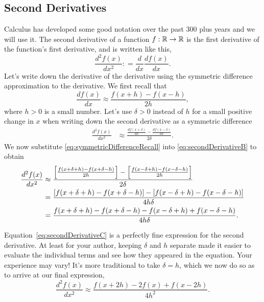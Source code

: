 \subsection{Second Derivatives}
\label{sec:SecondDerivative}

Calculus has developed some good notation over the past 300 plus years and we will use it. The second derivative of a function  $f:\mathbb R \to \mathbb R $ is the first derivative of the function's first derivative, and is written like this,
\begin{equation}
    \label{eq:secondDerivative}
    \frac{d^2 f(x)}{dx^2}: = \frac{d}{dx}\frac{df(x)}{dx}.
\end{equation}
Let's write down the derivative of the derivative using the symmetric difference approximation to the derivative. We first recall that
\begin{equation}
\label{eq:symmetricDifferenceRecall}
   \frac{df(x)}{dx}\approx \frac{f(x + h)- f(x-  h)}{2 h},
\end{equation}
where $h>0$ is a small number. 
Let's use $\delta>0$ instead of $h$ for a small positive change in $x$ when writing down the second derivative as a symmetric difference
\begin{equation}
    \label{eq:secondDerivativeB}
    \begin{aligned}
    \frac{d^2 f(x)}{dx^2}&\approx\frac{ \frac{df(x+\delta)}{dx} -  \frac{df(x-\delta)}{dx} }{2 \delta}.
    \end{aligned}
\end{equation}
We now substitute \eqref{eq:symmetricDifferenceRecall} into \eqref{eq:secondDerivativeB} to obtain
\begin{equation}
    \label{eq:secondDerivativeC}
    \begin{aligned}
    \frac{d^2 f(x)}{dx^2}&\approx\frac{ \left[ \frac{f(x + \delta + h)- f(x + \delta -  h)}{2 h}  \right]-   \left[ \frac{f(x - \delta + h)- f(x - \delta -  h)}{2 h}  \right]}{2 \delta} \medskip\\
    & = \frac{ \left[f(x + \delta + h)- f(x + \delta -  h) \right]-   \left[ f(x - \delta + h)- f(x - \delta -  h) \right]}{4 h \delta} \medskip \\
     & = \frac{ f(x + \delta + h)- f(x + \delta -  h) -   f(x - \delta + h) +  f(x - \delta -  h) }{4 h \delta}.
    \end{aligned}
\end{equation}

Equation~\eqref{eq:secondDerivativeC} is a perfectly fine expression for the second derivative. At least for your author, keeping $\delta$ and $h$ separate made it easier to evaluate the individual terms and see how they appeared in the equation. Your experience may vary! It's more traditional to take $\delta = h$, which we now do so as to arrive at our final expression,
\begin{equation}
    \label{eq:secondDerivativeD} \boxed{
    \frac{d^2 f(x)}{dx^2}\approx \frac{ f(x + 2h)- 2 f(x )  +  f(x -2 h) }{4 h^2}
    }.
\end{equation}

